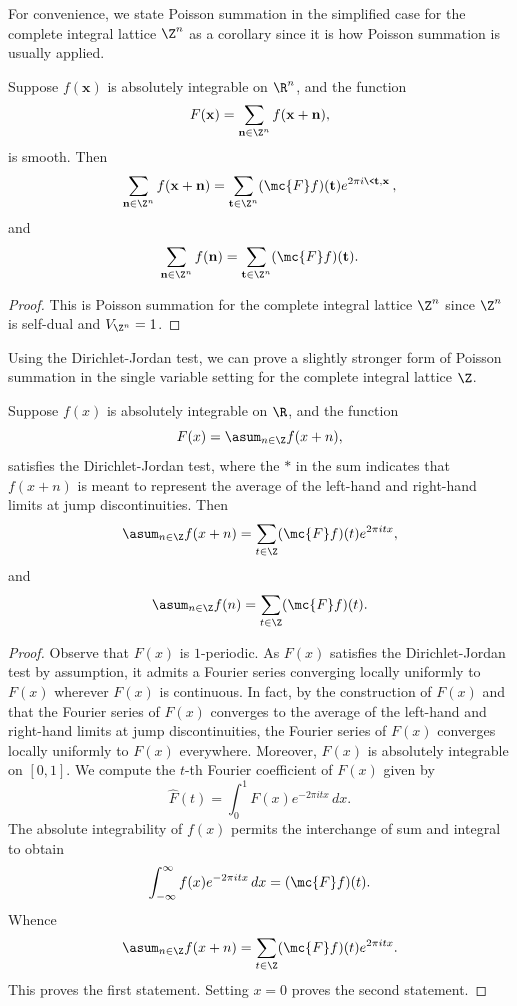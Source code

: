     For convenience, we state Poisson summation in the simplified case for the complete integral lattice \(\Z^{n}\) as a corollary since it is how Poisson summation is usually applied.

    \begin{corollary}
      Suppose \(f(\mathbf{x})\) is absolutely integrable on \(\R^{n}\), and the function
      \[
        F(\mathbf{x}) = \sum_{\mathbf{n} \in \Z^{n}}f(\mathbf{x}+\mathbf{n}),
      \]
      is smooth. Then
      \[
        \sum_{\mathbf{n} \in \Z^{n}}f(\mathbf{x}+\mathbf{n}) = \sum_{\mathbf{t} \in \Z^{n}}(\mc{F}f)(\mathbf{t})e^{2\pi i\<\mathbf{t},\mathbf{x}\>},
      \]
      and
      \[
        \sum_{\mathbf{n} \in \Z^{n}}f(\mathbf{n}) = \sum_{\mathbf{t} \in \Z^{n}}(\mc{F}f)(\mathbf{t}).
      \]
    \end{corollary}
    \begin{proof}
      This is Poisson summation for the complete integral lattice \(\Z^{n}\) since \(\Z^{n}\) is self-dual and \(V_{\Z^{n}} = 1\).
    \end{proof}

    Using the Dirichlet-Jordan test, we can prove a slightly stronger form of Poisson summation in the single variable setting for the complete integral lattice \(\Z\).

    \begin{theorem}
      Suppose \(f(x)\) is absolutely integrable on \(\R\), and the function
      \[
        F(x) = \asum_{n \in \Z}f(x+n),
      \]
      satisfies the Dirichlet-Jordan test, where the \(\ast\) in the sum indicates that \(f(x+n)\) is meant to represent the average of the left-hand and right-hand limits at jump discontinuities. Then
      \[
        \asum_{n \in \Z}f(x+n) = \sum_{t \in \Z}(\mc{F}f)(t)e^{2\pi itx},
      \]
      and
      \[
        \asum_{n \in \Z}f(n) = \sum_{t \in \Z}(\mc{F}f)(t).
      \]
    \end{theorem}
    \begin{proof}
      Observe that \(F(x)\) is \(1\)-periodic. As \(F(x)\) satisfies the Dirichlet-Jordan test by assumption, it admits a Fourier series converging locally uniformly to \(F(x)\) wherever \(F(x)\) is continuous. In fact, by the construction of \(F(x)\) and that the Fourier series of \(F(x)\) converges to the average of the left-hand and right-hand limits at jump discontinuities, the Fourier series of \(F(x)\) converges locally uniformly to \(F(x)\) everywhere. Moreover, \(F(x)\) is absolutely integrable on \([0,1]\). We compute the \(t\)-th Fourier coefficient of \(F(x)\) given by
      \[
        \hat{F}(t) = \int_{0}^{1}F(x)e^{-2\pi itx}\,dx.
      \]
      The absolute integrability of \(f(x)\) permits the interchange of sum and integral to obtain
      \[
        \int_{-\infty}^{\infty}f(x)e^{-2\pi itx}\,dx = (\mc{F}f)(t).
      \]
      Whence
      \[
        \asum_{n \in \Z}f(x+n) = \sum_{t \in \Z}(\mc{F}f)(t)e^{2\pi itx}.
      \]
      This proves the first statement. Setting \(x = 0\) proves the second statement.
    \end{proof}


